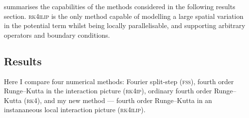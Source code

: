  summarises the capabilities of the methods considered in the following results section. \textsc{rk4ilip} is the only method capable of modelling a large spatial variation in the potential term whilst being locally parallelisable, and supporting arbitrary operators and boundary conditions.

\subsection{Results}


 Here I compare four numerical methods: Fourier split-step (\textsc{fss}), fourth order Runge--Kutta in the interaction picture (\textsc{rk4ip}), ordinary fourth order Runge--Kutta (\textsc{rk4}), and my new method --- fourth order Runge--Kutta in an instananeous local interaction picture (\textsc{rk4ilip}).

